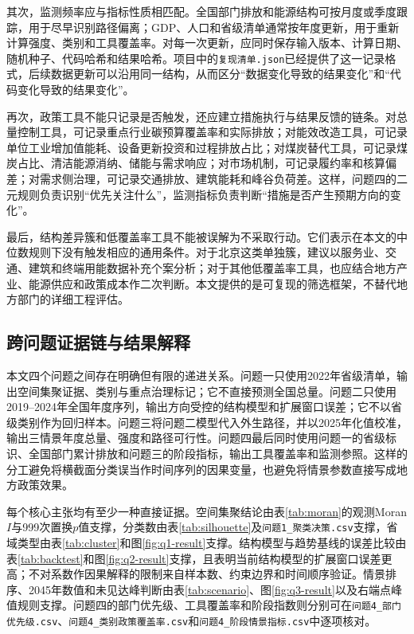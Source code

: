 \documentclass[12pt,a4paper]{ctexart}
\theoremstyle{definition}
\theoremstyle{plain}
\theoremstyle{remark}
\begin{document}
其次，监测频率应与指标性质相匹配。全国部门排放和能源结构可按月度或季度跟踪，用于尽早识别路径偏离；GDP、人口和省级清单通常按年度更新，用于重新计算强度、类别和工具覆盖率。对每一次更新，应同时保存输入版本、计算日期、随机种子、代码哈希和结果哈希。项目中的\texttt{复现清单.json}已经提供了这一记录格式，后续数据更新可以沿用同一结构，从而区分“数据变化导致的结果变化”和“代码变化导致的结果变化”。

再次，政策工具不能只记录是否触发，还应建立措施执行与结果反馈的链条。对总量控制工具，可记录重点行业碳预算覆盖率和实际排放；对能效改造工具，可记录单位工业增加值能耗、设备更新投资和过程排放占比；对煤炭替代工具，可记录煤炭占比、清洁能源消纳、储能与需求响应；对市场机制，可记录履约率和核算偏差；对需求侧治理，可记录交通排放、建筑能耗和峰谷负荷差。这样，问题四的二元规则负责识别“优先关注什么”，监测指标负责判断“措施是否产生预期方向的变化”。

最后，结构差异簇和低覆盖率工具不能被误解为不采取行动。它们表示在本文的中位数规则下没有触发相应的通用条件。对于北京这类单独簇，建议以服务业、交通、建筑和终端用能数据补充个案分析；对于其他低覆盖率工具，也应结合地方产业、能源供应和政策成本作二次判断。本文提供的是可复现的筛选框架，不替代地方部门的详细工程评估。
\subsection{跨问题证据链与结果解释}
本文四个问题之间存在明确但有限的递进关系。问题一只使用2022年省级清单，输出空间集聚证据、类别与重点治理标记；它不直接预测全国总量。问题二只使用2019--2024年全国年度序列，输出方向受控的结构模型和扩展窗口误差；它不以省级类别作为回归样本。问题三将问题二模型代入外生路径，并以2025年化值校准，输出三情景年度总量、强度和路径可行性。问题四最后同时使用问题一的省级标识、全国部门累计排放和问题三的阶段指标，输出工具覆盖率和监测参照。这样的分工避免将横截面分类误当作时间序列的因果变量，也避免将情景参数直接写成地方政策效果。

每个核心主张均有至少一种直接证据。空间集聚结论由表\ref{tab:moran}的观测Moran $I$与999次置换$p$值支撑，分类数由表\ref{tab:silhouette}及\texttt{问题1\_聚类决策.csv}支撑，省域类型由表\ref{tab:cluster}和图\ref{fig:q1-result}支撑。结构模型与趋势基线的误差比较由表\ref{tab:backtest}和图\ref{fig:q2-result}支撑，且表明当前结构模型的扩展窗口误差更高；不对系数作因果解释的限制来自样本数、约束边界和时间顺序验证。情景排序、2045年数值和未见达峰判断由表\ref{tab:scenario}、图\ref{fig:q3-result}以及右端点峰值规则支撑。问题四的部门优先级、工具覆盖率和阶段指数则分别可在\texttt{问题4\_部门优先级.csv}、\texttt{问题4\_类别政策覆盖率.csv}和\texttt{问题4\_阶段情景指标.csv}中逐项核对。
\end{document}
